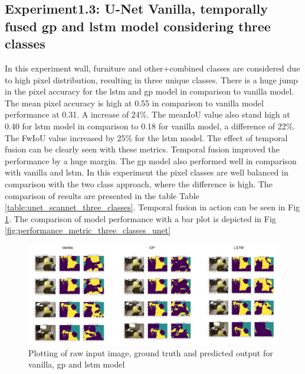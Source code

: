     \subsection{Experiment1.3: U-Net Vanilla, temporally fused gp and lstm model considering three classes}
	
	In this experiment wall, furniture and other+combined classes are considered due to high pixel distribution, resulting in three unique classes. There is a huge jump in the pixel accuracy for the lstm and gp model in comparison to vanilla model. The mean pixel accuracy is high at 0.55 in comparison to vanilla model performance at 0.31. A increase of 24\%. The meanIoU value also stand high at 0.40 for lstm model in comparison to 0.18 for vanilla model, a difference of 22\%. The FwIoU value increased by 25\% for the lstm model. The effect of temporal fusion can be clearly seen with these metrics. Temporal fusion improved the performance by a huge margin. The gp model also performed well in comparison with vanilla and lstm. In this experiment the pixel classes are well balanced in comparison with the two class approach, where the difference is high. The comparison of results are presented in the table Table \ref{table:unet_scannet_three_classes}. Temporal fusion in action can be seen in Fig \ref{fig:performance_metric_three_classes_scannet}. The comparison of model performance with a bar plot is depicted in Fig \ref{fig:performance_metric_three_classes_unet}
	
	\begin{figure}
		\centering
		\includegraphics[width=16cm]{images/unet_scannet_three_classes.png}
		\caption{Plotting of raw input image, ground truth and predicted output for vanilla, gp and lstm model}
		\label{fig:performance_metric_three_classes_scannet}
	\end{figure}

